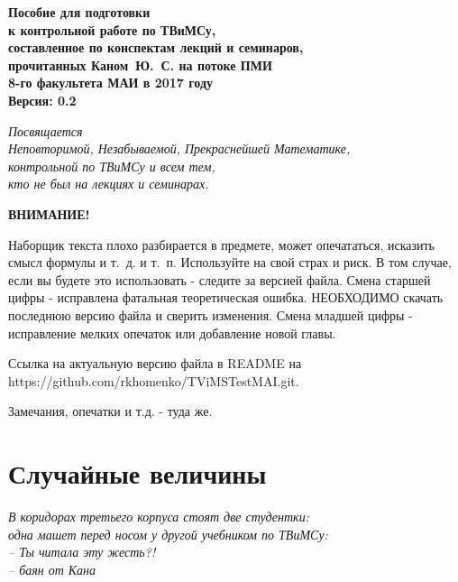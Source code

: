 \documentclass[12pt]{report}
\theoremstyle{plain}
\theoremstyle{definition}
\begin{document}
\begin{titlepage}
    \centering
    \vspace{5cm}
    \Large{\textbf{
        Пособие для подготовки\\
        к контрольной работе по ТВиМСу, \\
        составленное по конспектам лекций и семинаров, \\
        прочитанных Каном~Ю.~С. на потоке ПМИ \\
        8-го факультета МАИ в 2017 году}} \\
    \vspace{15cm}
    \textbf{Версия: 0.2}
\end{titlepage}

\thispagestyle{empty}
\begin{flushright}
    \Large{\textit{
        Посвящается \\ Неповторимой, Незабываемой, Прекраснейшей Математике, \\
        контрольной по ТВиМСу и всем тем, \\
        кто не был на лекциях и семинарах.
    }}
\end{flushright}
\newpage

\thispagestyle{empty}
\begin{center}
    \LARGE{\textbf{ВНИМАНИЕ!}}
\end{center}
\Large{
    Наборщик текста плохо разбирается в предмете, может опечататься, исказить смысл формулы и т.~д. и т.~п.
    Используйте на свой страх и риск. В том случае, если вы будете это использовать - следите за
    версией файла. Смена старшей цифры - исправлена фатальная теоретическая ошибка. НЕОБХОДИМО
    скачать последнюю версию файла и сверить изменения. Смена младшей цифры - исправление мелких опечаток или
    добавление новой главы.

    Ссылка на актуальную версию файла в README на \\ https://github.com/rkhomenko/TViMSTestMAI.git.

    Замечания, опечатки и т.д. - туда же.
}
\newpage

\tableofcontents

\chapter{Случайные величины}
\begin{flushright}
    \textit{
        В коридорах третьего корпуса стоят две студентки: \\
        одна машет перед носом у другой учебником по ТВиМСу: \\
        -- Ты читала эту жесть?! \\
        -- баян от Кана
    }
\end{flushright}
\end{document}
